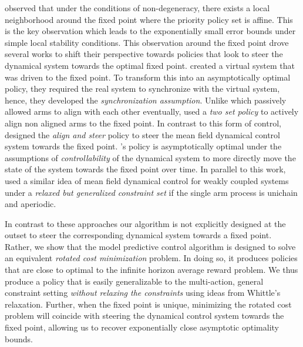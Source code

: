 \citet{GGY23, GGY23b} observed that under the conditions of non-degeneracy, there exists a local neighborhood around the fixed point where the priority policy set is affine. This is the key observation which leads to the exponentially small error bounds under simple local stability conditions. This observation around the fixed point drove several works \citep{HXCW23, HXCW24,hong2024unichain, Avrachenkov2024, yan2024} to shift their perspective towards policies that look to steer the dynamical system towards the optimal fixed point. \citet{HXCW23} created a virtual system that was driven to the fixed point. To transform this into an asymptotically optimal policy, they required the real system to synchronize with the virtual system, hence, they developed the \emph{synchronization assumption}. Unlike \citet{HXCW23} which passively allowed arms to align with each other eventually, \citet{HXCW24} used a \emph{two set policy} to actively align non aligned arms to the fixed point. In contrast to this form of control, \citet{yan2024} designed the \emph{align and steer} policy to steer the mean field dynamical control system towards the fixed point. \citet{yan2024}'s policy is asymptotically optimal under the assumptions of \emph{controllability} of the dynamical system to more directly move the state of the system towards the fixed point over time. In parallel to this work, \citet{Avrachenkov2024} used a similar idea of mean field dynamical control for weakly coupled systems under a \emph{relaxed but generalized constraint set} if the single arm process is unichain and aperiodic.

In contrast to these approaches our algorithm is not explicitly designed at the outset to steer the corresponding dynamical system towards a fixed point. Rather, we show that the model predictive control algorithm is designed to solve an equivalent \emph{rotated cost minimization} problem. In doing so, it produces policies that are close to optimal to the infinite horizon average reward problem. We  thus produce a policy that is easily generalizable to the multi-action, general constraint setting \emph{without relaxing the constraints} using ideas from Whittle's relaxation. Further, when the fixed point is unique, minimizing the rotated cost problem will coincide with steering the dynamical control system towards the fixed point, allowing us to recover exponentially close asymptotic optimality bounds.

